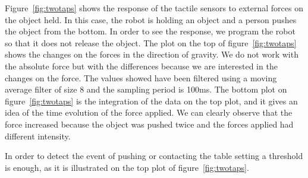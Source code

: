 Figure~\ref{fig:twotaps} shows the response of the tactile sensors
to external forces on the object held. In this case, the robot is
holding an object and a person pushes the object from the bottom.
In order to see the response, we program the robot so that it does
not release the object. The plot on the top of
figure~\ref{fig:twotaps} shows the changes on the forces in the
direction of gravity.  We do not work with the absolute force but
with the differences because we are interested in the changes on
the force. The values showed have been filtered using a moving
average filter of size 8 and the sampling period is 100ms. The
bottom plot on figure~\ref{fig:twotaps} is the integration of the
data on the top plot, and it gives an idea of the time evolution
of the force applied. We can clearly observe that the force
increased because the object was pushed twice and the forces
applied had different intensity.

In order to detect the event of pushing or contacting the table
setting a threshold is enough, as it is illustrated on the top
plot of figure~\ref{fig:twotaps}.

%
